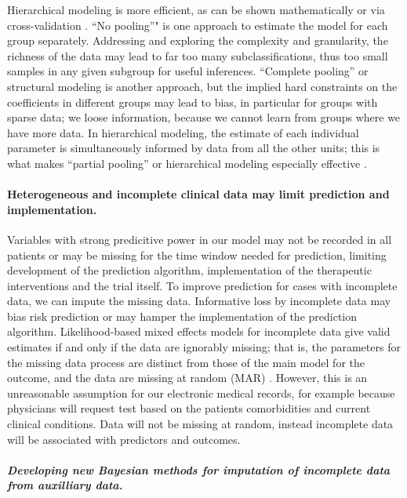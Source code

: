 \documentclass[]{article}
\begin{document}
Hierarchical modeling is more efficient, as can be shown mathematically
or via cross-validation \cite{Gelman-Hill_2014}. ``No pooling''" is one
approach to estimate the model for each group separately. Addressing and
exploring the complexity and granularity, the richness of the data may
lead to far too many subclassifications, thus too small samples in any
given subgroup for useful inferences. ``Complete pooling'' or structural
modeling is another approach, but the implied hard constraints on the
coefficients in different groups may lead to bias, in particular for
groups with sparse data; we loose information, because we cannot learn
from groups where we have more data. In hierarchical modeling, the
estimate of each individual parameter is simultaneously informed by data
from all the other units; this is what makes ``partial pooling'' or
hierarchical modeling especially effective
\cite{Gelman_multilevel_2006}.

\paragraph{Heterogeneous and incomplete clinical data may limit
prediction and
implementation.}\label{heterogeneous-and-incomplete-clinical-data-may-limit-prediction-and-implementation.}

Variables with strong predicitive power in our model may not be recorded
in all patients or may be missing for the time window needed for
prediction, limiting development of the prediction algorithm,
implementation of the therapeutic interventions and the trial itself. To
improve prediction for cases with incomplete data, we can impute the
missing data. Informative loss by incomplete data may bias risk
prediction or may hamper the implementation of the prediction algorithm.
Likelihood-based mixed effects models for incomplete data give valid
estimates if and only if the data are ignorably missing; that is, the
parameters for the missing data process are distinct from those of the
main model for the outcome, and the data are missing at random (MAR)
\cite{Rubin_1976}. However, this is an unreasonable assumption for our
electronic medical records, for example because physicians will request
test based on the patients comorbidities and current clinical
conditions. Data will not be missing at random, instead incomplete data
will be associated with predictors and outcomes.

\subparagraph{Developing new Bayesian methods for imputation of
incomplete data from auxilliary
data.}\label{developing-new-bayesian-methods-for-imputation-of-incomplete-data-from-auxilliary-data.}
\end{document}

